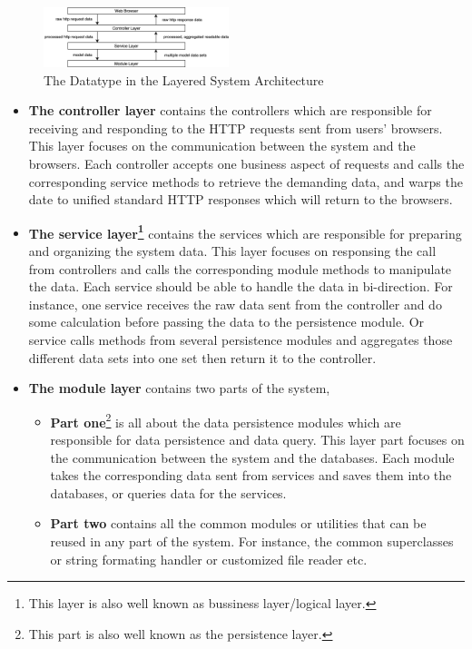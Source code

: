 \documentclass[conference]{IEEEtran}
\begin{document}
\begin{figure}[!ht]
	\centering
	\includegraphics[width=0.48\textwidth]{arch-dataflow.png}
	\caption{The Datatype in the Layered System Architecture}
	\label{fig:arch-dataflow}
\end{figure}

\begin{itemize}
	\item[1] \textbf{The controller layer} contains the controllers which are responsible for receiving and responding to the HTTP requests sent from users' browsers.
		This layer focuses on the communication between the system and the browsers.
		Each controller accepts one business aspect of requests and calls the corresponding service methods to retrieve the demanding data,
		and warps the date to unified standard HTTP responses which will return to the browsers.
	\item[2] \textbf{The service layer\footnote{This layer is also well known as bussiness layer/logical layer.}} contains the services which are responsible for preparing and organizing the system data.
		This layer focuses on responsing the call from controllers and calls the corresponding module methods to manipulate the data.
		Each service should be able to handle the data in bi-direction. For instance, one service receives the raw data sent from the controller and do some calculation before passing the data to the persistence module.
		Or service calls methods from several persistence modules and aggregates those different data sets into one set then return it to the controller.
	\item[3] \textbf{The module layer} contains two parts of the system,
		\begin{itemize}
			\item \textbf{Part one}\footnote{This part is also well known as the persistence layer.} is all about the data persistence modules which are responsible for data persistence and data query.
			      This layer part focuses on the communication between the system and the databases.
			      Each module takes the corresponding data sent from services and saves them into the databases, or queries data for the services.
			\item \textbf{Part two} contains all the common modules or utilities that can be reused in any part of the system.
			      For instance, the common superclasses or string formating handler or customized file reader etc.
		\end{itemize}

\end{itemize}
\end{document}
